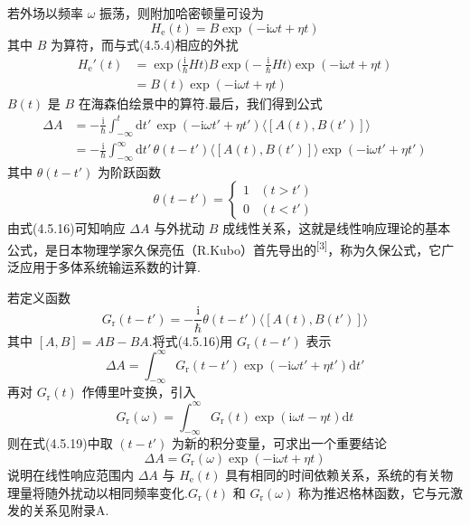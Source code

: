 若外场以频率 $\omega$ 振荡，则附加哈密顿量可设为
\begin{equation}
  H_{\mathrm{e}}(t)=B\exp\left(-\mathrm{i}\omega t+\eta t\right)
\end{equation}
其中 $B$ 为算符，而与式(4.5.4)相应的外扰
\begin{equation}
\begin{aligned}
  H_{\mathrm{e}}'(t)&=\exp\Big(\frac{\mathrm{i}}{\hbar}Ht\Big)B
  \exp\Big(-\frac{\mathrm{i}}{\hbar}Ht\Big)\exp\left(-\mathrm{i}\omega t+\eta t\right)\\
  &=B(t)\exp\left(-\mathrm{i}\omega t+\eta t\right)
\end{aligned}
\end{equation}
$B(t)$ 是 $B$ 在海森伯绘景中的算符.最后，我们得到公式
\begin{equation}
\begin{aligned}
  \Delta A
  &=-\frac{\mathrm{i}}{\hbar}\int_{-\infty}^{t}\mathrm{d}t'\,
  \exp\left(-\mathrm{i}\omega t'+\eta t'\right)
  \langle\left[A(t),B(t')\right]\rangle\\
  &=-\frac{\mathrm{i}}{\hbar}\int_{-\infty}^{\infty}\mathrm{d}t'\,
  \theta(t-t')\langle\left[A(t),B(t')\right]\rangle
  \exp\left(-\mathrm{i}\omega t'+\eta t'\right)
\end{aligned}
\end{equation}
其中 $\theta(t-t')$ 为阶跃函数
\begin{equation}
  \theta(t-t')=\left\{\begin{array}{ll}
  1 & (t>t')\\
  0 & (t<t')
  \end{array}\right.
\end{equation}
由式(4.5.16)可知响应 $\Delta A$ 与外扰动 $B$ 成线性关系，这就是线性响应理论的基本公式，是日本物理学家久保亮伍（R.Kubo）首先导出的\textsuperscript{[3]}，称为久保公式，它广泛应用于多体系统输运系数的计算.

若定义函数
\begin{equation}
  G_{\mathrm{r}}(t-t')=-\frac{\mathrm{i}}{\hbar}\theta(t-t')
  \langle\left[A(t),B(t')\right]\rangle
\end{equation}
其中 $\left[A,B\right]=AB-BA$.将式(4.5.16)用 $G_{\mathrm{r}}(t-t')$ 表示
\begin{equation}
  \Delta A=\int_{-\infty}^{\infty}G_{\mathrm{r}}(t-t')
  \exp\left(-\mathrm{i}\omega t'+\eta t'\right)\mathrm{d}t'
\end{equation}
再对 $G_{\mathrm{r}}(t)$ 作傅里叶变换，引入
\begin{equation}
  G_{\mathrm{r}}(\omega)=\int_{-\infty}^{\infty}G_{\mathrm{r}}(t)
  \exp\left(\mathrm{i}\omega t-\eta t\right)\mathrm{d}t
\end{equation}
则在式(4.5.19)中取 $(t-t')$ 为新的积分变量，可求出一个重要结论
\begin{equation}
  \Delta A=G_{\mathrm{r}}(\omega)\exp\left(-\mathrm{i}\omega t+\eta t\right)
\end{equation}
说明在线性响应范围内 $\Delta A$ 与 $H_{\mathrm{e}}(t)$ 具有相同的时间依赖关系，系统的有关物理量将随外扰动以相同频率变化.$G_{\mathrm{r}}(t)$ 和 $G_{\mathrm{r}}(\omega)$ 称为推迟格林函数，它与元激发的关系见附录A.

